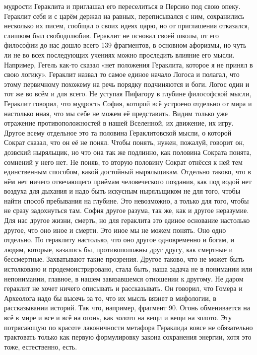 мудрости Гераклита и приглашал его переселиться в Персию под свою опеку.
Гераклит себя и с царём держал на равных, переписывался с ним, сохранились
несколько их писем, сообщал о своих идеях царю, но от приглашения отказался,
слишком был свободолюбив. Гераклит не основал своей школы, от его философии до
нас дошло всего 139 фрагментов, в основном афоризмы, но чуть ли не во всех
последующих учениях можно проследить влияние его мысли. Например, Гегель как-то
сказал «нет положения Гераклита, которое я не принял в свою логику». Гераклит
назвал то самое единое начало Логоса и полагал, что этому первичному похожему на
речь порядку подчиняются и боги. Логос один и тот же во всём и для всего. Не
уступая Пифагору в глубине философской мысли, Гераклит говорил, что мудрость
София, которой всё устроено отдельно от мира и настолько иная, что мы себе не
можем её представить. Видим только уже отражение противоположностей в нашей
Вселенной, их движение, их игру. Другое всему отдельное это та половина
Гераклитовской мысли, о которой Сократ сказал, что он её не понял. Чтобы понять,
нужен, пожалуй, говорит он, дозвский ныряльщик, но что она так же подлинно, как
половина Сократа понята, сомнений у него нет. Не поняв, то вторую половину
Сократ отнёсся к ней тем единственным способом, какой достойный ныряльщикам.
Отдельно таково, что в нём нет ничего отвечающего приёмам человеческого
поздания, как под водой нет воздуха для дыхания и надо быть искусным ныряльщиком
не для того, чтобы найти способ пребывания на глубине. Это невозможно, а только
для того, чтобы не сразу задохнуться там. София другое разума, так же, как и
другое неразумие. Для нас другое жизни, смерть, но для гераклита это единое
основание настолько другое, что оно иное и смерти. Это иное мы не можем понять.
Оно одно отдельно. По гераклиту настолько, что оно другое одновременно и богам,
и людям, которые, казалось бы, противоположны друг другу, как смертные и
бессмертные. Захватывают такие прозрения. Другое таково, что не может быть
истолковано и продемонстрировано, стала быть, наша задача не в понимании или
непонимании, главное, в нашем завязавшемся отношении к другому. Не даром
гераклит не хочет ничего описывать и рассказывать. Он говорил, что Гомера и
Археолога надо бы высечь за то, что их мысль вязнет в мифологии, в рассказывании
историй. Так что, например, фрагмент 90. Огонь обменивается на всё в мире и все
и всё на огонь, как золото на вещи и вещи на золото. Эту потрясающую по красоте
лаконичности метафора Гераклида вовсе не обязательно трактовать только как
первую формулировку закона сохранения энергии, хотя это тоже, естественно, есть.
